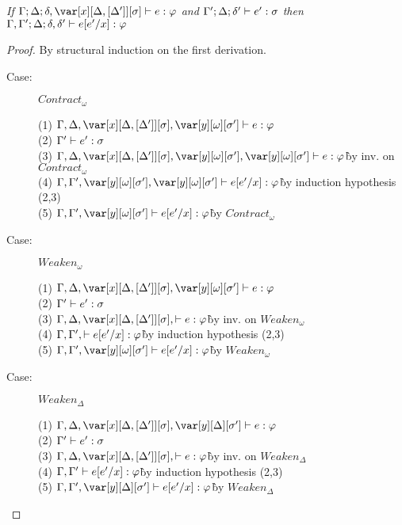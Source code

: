 
\begin{lemma}
\emph{If $\G; \D; \d, \xD \vdash e : \varphi$ and $\Gamma'; \Delta; \delta' \vdash e' : \sigma$ then $\Gamma, \Gamma' ; \Delta; \delta,\delta' \vdash e[e'/x] : \varphi$}
\end{lemma}
\begin{proof}
By structural induction on the first derivation.

\begin{description}

\item[Case:] $Contract_\omega$
\begin{tabbing}
    (1) $\G, \D, \xD, \yo \vdash e : \vp$\\
    (2) $\Gamma' \vdash e' : \sigma$\\
    (3) $\G, \D, \xD, \yo, \yo \vdash e : \vp$\` by inv. on $Contract_\omega$\\
    (4) $\G, \G', \yo, \yo \vdash e[e'/x] : \vp$\` by induction hypothesis (2,3)\\
    (5) $\G, \G', \yo \vdash e[e'/x] : \vp$\` by $Contract_\omega$\\
\end{tabbing}

\item[Case:] $Weaken_\omega$
\begin{tabbing}
    (1) $\G, \D, \xD, \yo \vdash e : \vp$\\
    (2) $\Gamma' \vdash e' : \sigma$\\
    (3) $\G, \D, \xD, \vdash e : \vp$\` by inv. on $Weaken_\omega$\\
    (4) $\Gamma, \Gamma', \vdash e[e'/x] : \varphi$\` by induction hypothesis (2,3)\\
    (5) $\G, \G', \yo \vdash e[e'/x] : \vp$\` by $Weaken_\omega$\\
\end{tabbing}

\item[Case:] $Weaken_\Delta$
\begin{tabbing}
    (1) $\G, \D, \xD, \yD \vdash e : \vp$\\
    (2) $\Gamma' \vdash e' : \sigma$\\
    (3) $\G, \D, \xD, \vdash e : \vp$\` by inv. on $Weaken_\Delta$\\
    (4) $\Gamma, \Gamma' \vdash e[e'/x] : \varphi$\` by induction hypothesis (2,3)\\
    (5) $\G, \G', \yD \vdash e[e'/x] : \vp$\` by $Weaken_\Delta$\\
\end{tabbing}


\end{description}
\end{proof}

